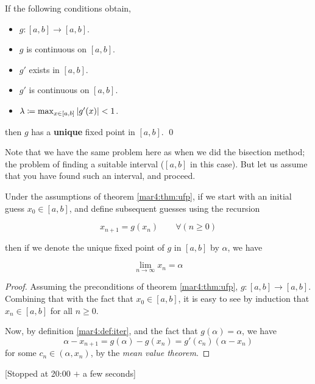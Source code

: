 \begin{thm}
  \label{mar4:thm:ufp}
  \hfill
  
  If the following conditions obtain,
  \begin{itemize}
  \item
    $g \colon [a, b] \to [a, b]$.

  \item
    $g$ is continuous on $[a, b]$.

    \item
    $g'$ exists in $[a, b]$.

  \item
    $g'$ is continuous on $[a, b]$.

  \item
    $\lambda \coloneqq \max_{x \in [a, b]} \abs{g'(x)} < 1$.

  \end{itemize}
  then $g$ has a \textbf{unique} fixed point in $[a, b]$.
  \hfill\qed
\end{thm}
Note that we have the same problem here as when we did the bisection method; the problem of finding a suitable interval ($[a, b]$ in this case). But let us assume that you have found such an interval, and proceed.

Under the assumptions of theorem \ref{mar4:thm:ufp}, if we start with an initial guess $x_0 \in [a, b]$, and define subsequent guesses using the recursion
\begin{defn}
  \label{mar4:def:iter}
  \[
    x_{n+1} = g(x_n) \qquad \forall(n \geq 0)
  \]
\end{defn}
then if we denote the unique fixed point of $g$ in $[a, b]$ by $\alpha$, we have
\begin{thm}
  \[
    \lim_{n\to\infty} x_n = \alpha
  \]
\end{thm}

\begin{proof}
  Assuming the preconditions of theorem \ref{mar4:thm:ufp}, $g \colon [a, b] \to [a, b]$. Combining that with the fact that $x_0 \in [a, b]$, it is easy to see by induction that $x_n \in [a, b]$ for all $n \geq 0$.

  Now, by definition \ref{mar4:def:iter}, and the fact that $g(\alpha) = \alpha$, we have
  \[
    \alpha - x_{n+1} = g(\alpha) - g(x_n) = g'(c_n)(\alpha - x_n)
  \]
  for some $c_n \in (\alpha, x_n)$, by the \emph{mean value theorem}.
\end{proof}

[Stopped at 20:00 $+$ a few seconds]

